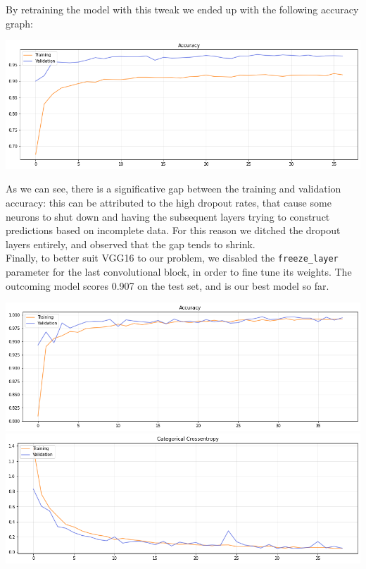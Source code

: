 \documentclass[10.5pt,a4paper,twocolumn]{article}
\begin{document}
By retraining the model with this tweak we ended up with the following accuracy graph:

\begin{minipage}{0.5\textwidth}
    \includegraphics[width=\textwidth]{../graphs/accuracy/08_vgg16_aug.png}
\end{minipage}

As we can see, there is a significative gap between the training and validation accuracy: this can be attributed to the high dropout rates, 
that cause some neurons to shut down and having the subsequent layers trying to construct predictions based on incomplete data.
For this reason we ditched the dropout layers entirely, and observed that the gap tends to shrink.\\

Finally, to better suit VGG16 to our problem, we disabled the \texttt{freeze\_layer} parameter for the last convolutional block, in order to fine tune its weights.
The outcoming model scores 0.907 on the test set, and is our best model so far.
\begin{minipage}{0.5\textwidth}
    \includegraphics[width=\textwidth]{../graphs/accuracy/09_vgg16_aug_nodrop_finetune.png}
    \includegraphics[width=\textwidth]{../graphs/categorical_crossentropy/09_vgg16_aug_nodrop_finetune.png}
\end{minipage}
\end{document}
